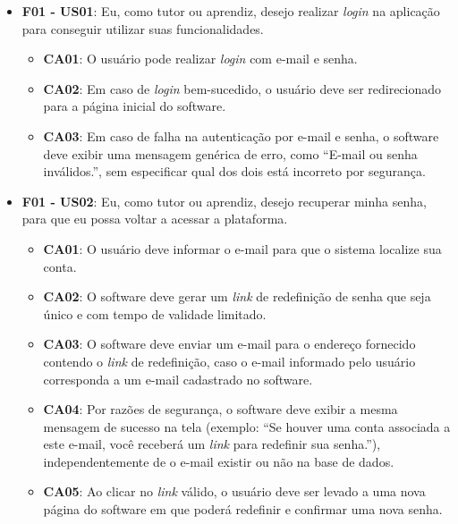 \begin{itemize}

\item \textbf{F01 - US01}: Eu, como tutor ou aprendiz, desejo realizar \textit{login} na aplicação para conseguir utilizar suas funcionalidades.

\begin{itemize}

\item \textbf{CA01}: O usuário pode realizar \textit{login} com e-mail e senha.

\item \textbf{CA02}: Em caso de \textit{login} bem-sucedido, o usuário deve ser redirecionado para a página inicial do software.

\item \textbf{CA03}: Em caso de falha na autenticação por e-mail e senha, o software deve exibir uma mensagem genérica de erro, como ``E-mail ou senha inválidos.'', sem especificar qual dos dois está incorreto por segurança.

\end{itemize}

\item \textbf{F01 - US02}: Eu, como tutor ou aprendiz, desejo recuperar minha senha, para que eu possa voltar a acessar a plataforma.

\begin{itemize}

\item \textbf{CA01}: O usuário deve informar o e-mail para que o sistema localize sua conta.

\item \textbf{CA02}: O software deve gerar um \textit{link} de redefinição de senha que seja único e com tempo de validade limitado.

\item \textbf{CA03}: O software deve enviar um e-mail para o endereço fornecido contendo o \textit{link} de redefinição, caso o e-mail informado pelo usuário corresponda a um e-mail cadastrado no software.

\item \textbf{CA04}: Por razões de segurança, o software deve exibir a mesma mensagem de sucesso na tela (exemplo: ``Se houver uma conta associada a este e-mail, você receberá um \textit{link} para redefinir sua senha.''), independentemente de o e-mail existir ou não na base de dados.

\item \textbf{CA05}: Ao clicar no \textit{link} válido, o usuário deve ser levado a uma nova página do software em que poderá redefinir e confirmar uma nova senha.


\end{itemize}
\end{itemize}
